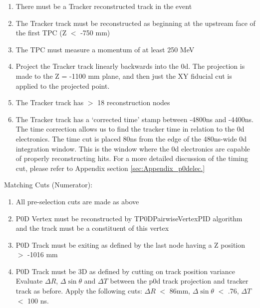\begin{enumerate}
\item There must be a Tracker reconstructed track in the event
\item The Tracker track must be reconstructed as beginning at the upstream face of the first TPC (Z \(<\) -750 mm)
\item The TPC must measure a momentum of at least 250 MeV
\item Project the Tracker track linearly backwards into the \p0d. The projection is made to the Z = -1100 mm plane, and then just the XY fiducial cut is applied to the projected point.
\item The Tracker track has \(>\) 18 reconstruction nodes
\item The Tracker track has a `corrected time' stamp between -4800ns and -4400ns. The time correction allows us to find the tracker time in relation to the \p0d electronics. The time cut is placed 80ns from the edge of the 480ns-wide \p0d integration window. This is the window where the \p0d electronics are capable of properly reconstructing hits. For a more detailed discussion of the timing cut, please refer to Appendix section \ref{sec:Appendix_p0delec.}
\end{enumerate}

Matching Cuts (Numerator):
\begin{enumerate}
\item All pre-selection cuts are made as above
\item P0D Vertex must be reconstructed by TP0DPairwiseVertexPID algorithm and the track must be a constituent of this vertex
\item P0D Track must be exiting as defined by the last node having a Z position $>$ -1016 mm
\item P0D Track must be 3D as defined by cutting on track position variance
Evaluate $\Delta R$, $\Delta \sin \theta$  and $\Delta T$ between the p0d track projection and tracker track as before. Apply the following cuts: $\Delta R$ \(<\) 86mm, $\Delta \sin \theta$ \(<\) .76, $\Delta T$ \(<\) 100 ns.
\end{enumerate}

